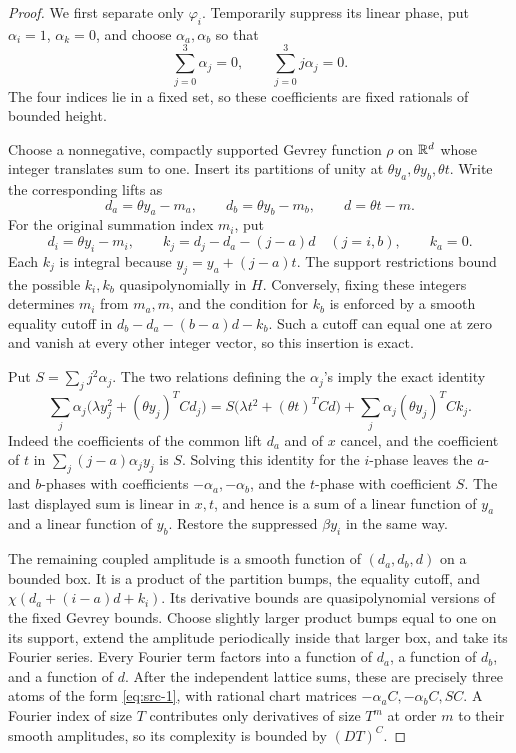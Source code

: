 \begin{proof}
We first separate only \(\varphi_i\).  Temporarily suppress its linear
phase, put \(\alpha_i=1\), \(\alpha_k=0\), and choose
\(\alpha_a,\alpha_b\) so that
\[
 \sum_{j=0}^3\alpha_j=0,\qquad
 \sum_{j=0}^3j\alpha_j=0.
\]
The four indices lie in a fixed set, so these coefficients are fixed
rationals of bounded height.

Choose a nonnegative, compactly supported Gevrey function
\(\rho\) on \(\mathbb R^d\) whose integer translates sum to one.
Insert its partitions of unity at \(\theta y_a,\theta y_b,\theta t\).
Write the corresponding lifts as
\[
 d_a=\theta y_a-m_a,\qquad
 d_b=\theta y_b-m_b,\qquad
 d=\theta t-m.
\]
For the original summation index \(m_i\), put
\[
 d_i=\theta y_i-m_i,\qquad
 k_j=d_j-d_a-(j-a)d\quad(j=i,b),\qquad k_a=0.
\]
Each \(k_j\) is integral because \(y_j=y_a+(j-a)t\).
The support restrictions bound the possible \(k_i,k_b\)
quasipolynomially in \(H\).
Conversely, fixing these integers determines \(m_i\) from
\(m_a,m\), and the condition for \(k_b\) is enforced by a smooth
equality cutoff in \(d_b-d_a-(b-a)d-k_b\).
Such a cutoff can equal one at zero and vanish at every other integer
vector, so this insertion is exact.

Put \(S=\sum_jj^2\alpha_j\).  The two relations defining the
\(\alpha_j\)'s imply the exact identity
\[
 \sum_j\alpha_j
       \bigl(\lambda y_j^2+(\theta y_j)^TCd_j\bigr)
 =S\bigl(\lambda t^2+(\theta t)^TCd\bigr)
       +\sum_j\alpha_j(\theta y_j)^TCk_j .
\]
Indeed the coefficients of the common lift \(d_a\) and of \(x\)
cancel, and the coefficient of \(t\) in
\(\sum_j(j-a)\alpha_jy_j\) is \(S\).
Solving this identity for the \(i\)-phase leaves the \(a\)- and
\(b\)-phases with coefficients \(-\alpha_a,-\alpha_b\), and the
\(t\)-phase with coefficient \(S\).
The last displayed sum is linear in \(x,t\), and hence is a sum
of a linear function of \(y_a\) and a linear function of \(y_b\).
Restore the suppressed \(\beta y_i\) in the same way.

The remaining coupled amplitude is a smooth function of
\((d_a,d_b,d)\) on a bounded box.  It is a product of the partition
bumps, the equality cutoff, and
\(\chi(d_a+(i-a)d+k_i)\).
Its derivative bounds are quasipolynomial versions of the fixed
Gevrey bounds.  Choose slightly larger product bumps equal to one
on its support, extend the amplitude periodically inside that larger
box, and take its Fourier series.  Every Fourier term factors into
a function of \(d_a\), a function of \(d_b\), and a function of \(d\).
After the independent lattice sums, these are precisely three atoms
of the form \eqref{eq:src-1}, with rational chart matrices
\(-\alpha_aC,-\alpha_bC,SC\).
A Fourier index of size \(T\) contributes only derivatives of size
\(T^m\) at order \(m\) to their smooth amplitudes, so its complexity
is bounded by \((DT)^C\).


\end{proof}

